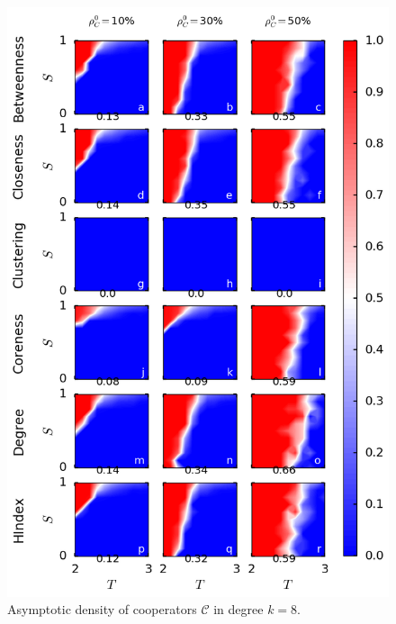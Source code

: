 \documentclass[preprint,12pt,3p]{elsarticle}
\begin{document}
\begin{figure}[htbp]
\centering
\includegraphics[width=13cm]{PowerlawK8TopRankTSPanel.png}

\caption{Asymptotic density of cooperators $\mathcal{C}$ in degree $k=8$.}
\label{PowerlawK8TopRankTSPanel}
\end{figure}
\end{document}
